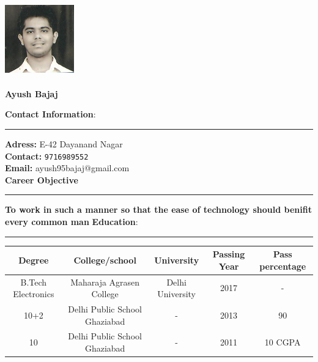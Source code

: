 \documentclass[a4paper,10pt]{article}
\begin{document}
\begin{flushright}
\includegraphics[width=3cm, height=4cm]{001.jpg}\\
\large
\textbf{\bigskip Ayush Bajaj}
\end{flushright}


\begin{flushleft}
	\textbf{\large Contact Information}:\\
	\hrule
	\bigskip
	\textbf{Adress:}            E-42 Dayanand Nagar\\
	\textbf{Contact:}   \texttt{9716989552}\\
	\textbf{Email:}             ayush95bajaj@gmail.com\\
	\bigskip
	\textbf{\large Career Objective} 
	\hrule
	\bigskip
	\textbf{To work in such a manner so that the ease of technology should benifit every common man}
	\textbf{\large  Education}:\\
	\hrule
	\bigskip
	\begin{tabular}{|c|c|c|c|c|}
   		\hline \textbf{ Degree}  & \textbf{College/school}  & \textbf{University} & \textbf{Passing Year} 			& 		\textbf{ Pass percentage} \\ 
   		\hline B.Tech Electronics & Maharaja Agrasen College  & Delhi University & 2017 & - \\ 
   		\hline 
			10+2 & Delhi Public School Ghaziabad & - & 2013 & 90 \\
    	\hline
\hline 
			10 & Delhi Public School Ghaziabad & - & 2011 & 10 CGPA \\
    	\hline
	\end{tabular} 
	\smallskip


\end{flushleft}
\end{document}
